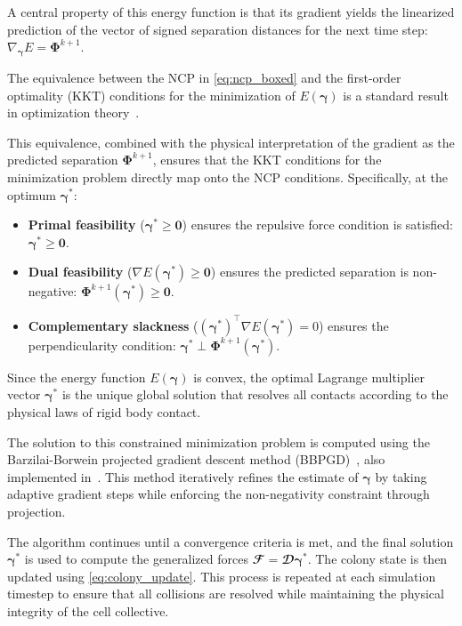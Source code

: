 \documentclass[conference]{IEEEtran}
\begin{document}
A central property of this energy function is that its gradient yields the linearized prediction of the vector of signed separation distances for the next time step: $\nabla_{\boldsymbol{\gamma}} E = \boldsymbol{\Phi}^{k+1}$.

The equivalence between the NCP in \autoref{eq:ncp_boxed} and the first-order optimality (KKT) conditions for the minimization of $E(\boldsymbol{\gamma})$ is a standard result in optimization theory~\cite{Nocedal2006}.

This equivalence, combined with the physical interpretation of the gradient as the predicted separation $\boldsymbol{\Phi}^{k+1}$, ensures that the KKT conditions for the minimization problem directly map onto the NCP conditions. Specifically, at the optimum $\boldsymbol{\gamma}^*$:

\begin{itemize}
    \item \textbf{Primal feasibility} ($\boldsymbol{\gamma}^* \ge \mathbf{0}$) ensures the repulsive force condition is satisfied: $\boldsymbol{\gamma}^* \ge \mathbf{0}$.
    \item \textbf{Dual feasibility} ($\nabla E(\boldsymbol{\gamma}^*) \ge \mathbf{0}$) ensures the predicted separation is non-negative: $\boldsymbol{\Phi}^{k+1}(\boldsymbol{\gamma}^*) \ge \mathbf{0}$.
    \item \textbf{Complementary slackness} ($(\boldsymbol{\gamma}^*)^\top \nabla E(\boldsymbol{\gamma}^*) = 0$) ensures the perpendicularity condition: $\boldsymbol{\gamma}^* \perp \boldsymbol{\Phi}^{k+1}(\boldsymbol{\gamma}^*)$.
\end{itemize}

Since the energy function $E(\boldsymbol{\gamma})$ is convex, the optimal Lagrange multiplier vector $\boldsymbol{\gamma}^*$ is the unique global solution that resolves all contacts according to the physical laws of rigid body contact.

The solution to this constrained minimization problem is computed using the Barzilai-Borwein projected gradient descent method (BBPGD)~\cite{BBPGD}, also implemented in~\cite{Weady2024}. This method iteratively refines the estimate of $\boldsymbol{\gamma}$ by taking adaptive gradient steps while enforcing the non-negativity constraint through projection.

The algorithm continues until a convergence criteria is met, and the final solution $\boldsymbol{\gamma}^*$ is used to compute the generalized forces $\mathbfcal{F} = \mathbfcal{D}\boldsymbol{\gamma}^*$. The colony state is then updated using \autoref{eq:colony_update}. This process is repeated at each simulation timestep to ensure that all collisions are resolved while maintaining the physical integrity of the cell collective.
\end{document}
